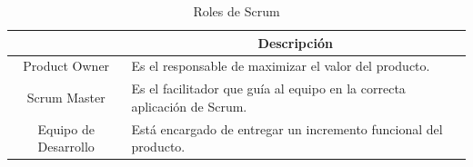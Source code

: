 \begin{table}[H]
    \centering
    \caption{Roles de Scrum}
    \label{tab:roles}
    \begin{tabular}{|c|m{}|}
    \hline
    \rowcolor{gray!50}
    \multicolumn{1}{|c|}{\textbf{Rol}} & \multicolumn{1}{c|}{\textbf{Descripción}} \\
    \hline
    Product Owner & Es el responsable de maximizar el valor del producto. \\
    \hline
    Scrum Master & Es el facilitador que guía al equipo en la correcta aplicación de Scrum. \\
    \hline
    Equipo de Desarrollo & Está encargado de entregar un incremento funcional del producto. \\
    \hline
    \end{tabular}
\end{table}